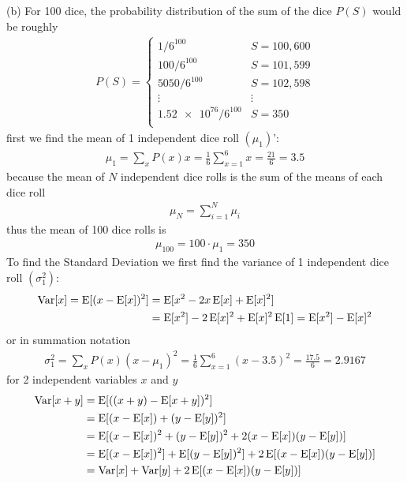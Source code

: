 \documentclass[../main.tex]{subfiles}
\begin{document}
(b) For 100 dice, the probability distribution of the sum of the dice $P(S)$ would be roughly
\begin{align*}
    P(S) = \begin{cases}
        1/6^{100} & S = 100, 600 \\
        100/6^{100} & S = 101, 599 \\
        5050/6^{100} & S = 102, 598 \\
        \vdots & \vdots \\
        \num{1.52e76}/6^{100} & S = 350 \\
    \end{cases}
\end{align*}
first we find the mean of 1 independent dice roll $(\mu_1)$':
\begin{align*}
    \mu_1 = \sum_{x} P(x) x = \frac{1}{6} \sum_{x=1}^{6} x = \frac{21}{6} = 3.5
\end{align*}
because the mean of $N$ independent dice rolls is the sum of the means of each dice roll
\begin{align*}
    \mu_N = \sum_{i=1}^{N} \mu_i
\end{align*}
thus the mean of 100 dice rolls is
\begin{align*}
    \mu_{100} = 100 \cdot \mu_1 = \boxed{350}
\end{align*}
To find the Standard Deviation we first find the variance of 1 independent dice roll $(\sigma_1^2)$:
\begin{align*}
    \operatorname{Var}[x] = \operatorname{E}[(x - \operatorname{E}[x])^2] &= \operatorname{E}[ x^2 - 2x\operatorname{E}[x] + \operatorname{E}[x]^2 ] \\
    &= \operatorname{E}[x^2] - 2\operatorname{E}[x]^2 + \operatorname{E}[x]^2\operatorname{E}[1] = \operatorname{E}[x^2] - \operatorname{E}[x]^2
\end{align*}
or in summation notation
\begin{align*}
    \sigma_1^2 = \sum_{x} P(x) (x - \mu_1)^2 = \frac{1}{6} \sum_{x=1}^{6} (x - 3.5)^2
    = \frac{17.5}{6} = 2.9167
\end{align*}
for 2 independent variables $x$ and $y$
\begin{align*}
    \operatorname{Var}[x + y] &= \operatorname{E}[((x + y) - \operatorname{E}[x + y])^2] \\
    &= \operatorname{E}[(x - \operatorname{E}[x]) + (y - \operatorname{E}[y])^2] \\
    &= \operatorname{E}[(x - \operatorname{E}[x])^2 + (y - \operatorname{E}[y])^2 + 2(x - \operatorname{E}[x])(y - \operatorname{E}[y])] \\
    &= \operatorname{E}[(x - \operatorname{E}[x])^2] + \operatorname{E}[(y - \operatorname{E}[y])^2] + 2\operatorname{E}[(x - \operatorname{E}[x])(y - \operatorname{E}[y])] \\
    &= \operatorname{Var}[x] + \operatorname{Var}[y] + 2\operatorname{E}[(x - \operatorname{E}[x])(y - \operatorname{E}[y])]
\end{align*}
\end{document}
